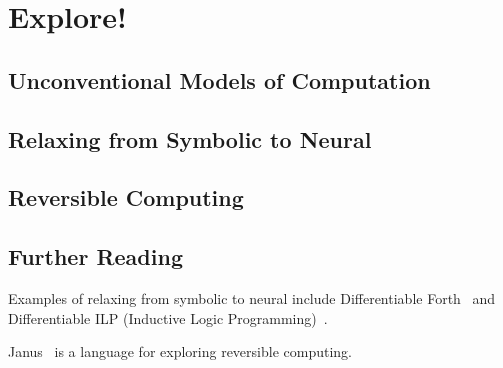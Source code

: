 \chapter{Explore!}

\section{Unconventional Models of Computation}
\section{Relaxing from Symbolic to Neural}
\section{Reversible Computing}

\section{Further Reading}

Examples of relaxing from symbolic to neural include Differentiable Forth~\citep{diffForth} and Differentiable ILP (Inductive Logic Programming)~\citep{diffILP}.

Janus~\citep{janus} is a language for exploring reversible computing.
